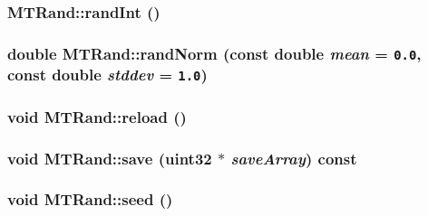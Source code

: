 \begin{CompactItemize}
\begin{CompactItemize}
\hypertarget{classMTRand_d1008efd4fe0e8aae30459c2c58cfe35}{
\subsubsection[{randInt}]{ MTRand::randInt ()}}
\label{classMTRand_d1008efd4fe0e8aae30459c2c58cfe35}


\hypertarget{classMTRand_4c284f626b6d40a0367ff2a949ea1944}{
\subsubsection[{randNorm}]{\setlength{\rightskip}{0pt plus 5cm}double MTRand::randNorm (const double {\em mean} = {\tt 0.0}, \/  const double {\em stddev} = {\tt 1.0})}}
\label{classMTRand_4c284f626b6d40a0367ff2a949ea1944}


\hypertarget{classMTRand_1d5fcb69d83f4d2fd653883c8352f86c}{
\subsubsection[{reload}]{\setlength{\rightskip}{0pt plus 5cm}void MTRand::reload ()}}
\label{classMTRand_1d5fcb69d83f4d2fd653883c8352f86c}


\hypertarget{classMTRand_d60e0f3f5c90baab75b74f9a2ccae871}{
\subsubsection[{save}]{\setlength{\rightskip}{0pt plus 5cm}void MTRand::save ({\bf uint32} $\ast$ {\em saveArray}) const}}
\label{classMTRand_d60e0f3f5c90baab75b74f9a2ccae871}


\hypertarget{classMTRand_d88ea3363d55bafb62826bbd130279c2}{
\subsubsection[{seed}]{\setlength{\rightskip}{0pt plus 5cm}void MTRand::seed ()}}
\label{classMTRand_d88ea3363d55bafb62826bbd130279c2}



\end{CompactItemize}
\end{CompactItemize}
